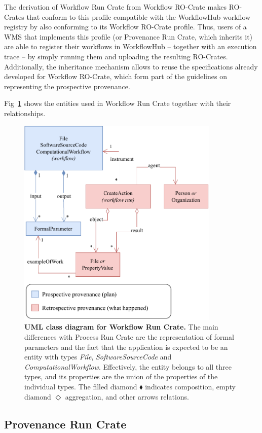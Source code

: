 \documentclass[10pt,letterpaper]{article}
\begin{document}
The derivation of Workflow Run Crate from Workflow RO-Crate makes RO-Crates that conform to this profile compatible with the WorkflowHub workflow registry by also conforming to its Workflow RO-Crate profile.
Thus, users of a WMS that implements this profile (or Provenance Run Crate, which inherits it) are able to register their workflows in WorkflowHub -- together with an execution trace -- by simply running them and uploading the resulting RO-Crates.
Additionally, the inheritance mechanism allows to reuse the specifications already developed for Workflow RO-Crate, which form part of the guidelines on representing the prospective provenance.

Fig~\ref{fig:workflow_crate_er} shows the entities used in Workflow Run Crate together with their relationships.

\begin{figure}[!h]
\includegraphics[width=26em]{wrroc-figure2.drawio.pdf}
\caption{{\bf UML class diagram for Workflow Run Crate.}
The main differences with Process Run Crate are the representation of formal parameters and the fact that the application is expected to be an entity with types \emph{File}, \emph{SoftwareSourceCode} and \emph{ComputationalWorkflow}.
Effectively, the entity belongs to all three types, and its properties are the union of the properties of the individual types.
The filled diamond $\blacklozenge$ indicates composition, empty diamond $\Diamond$ aggregation, and other arrows relations.
}
\label{fig:workflow_crate_er}
\end{figure}


\subsection{Provenance Run Crate}\label{provenance-run-crate}
\end{document}
